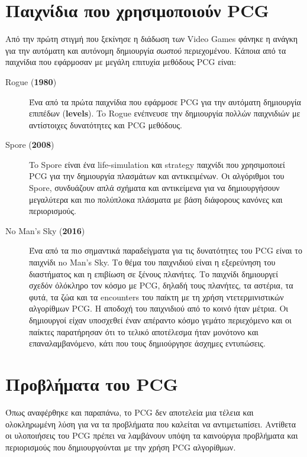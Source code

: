 \section{Παιχνίδια που χρησιμοποιούν PCG}

Από την πρώτη στιγμή που ξεκίνησε η διάδωση των Video Games φάνηκε η ανάγκη για την αυτόματη και αυτόνομη δημιουργία   \textit{σωστού} περιεχομένου. Κάποια από τα παιχνίδια που εφάρμοσαν με μεγάλη επιτυχία μεθόδους PCG είναι:

\begin{description}
\item [Rogue (\textbf{1980})] Ένα από τα πρώτα παιχνίδια που εφάρμοσε PCG για την αυτόματη δημιουργία επιπέδων (\textbf{levels}). To Rogue ενέπνευσε την δημιουργία πολλών παιχνιδιών με αντίστοιχες δυνατότητες και PCG μεθόδους.

\item [Spore (\textbf{2008})] To Spore είναι ένα life-simulation και strategy παιχνίδι που χρησιμοποιεί PCG για την δημιουργία πλασμάτων και αντικειμένων. Οι αλγόριθμοι του Spore, συνδυάζουν απλά σχήματα και αντικείμενα για να δημιουργήσουν μεγαλύτερα και πιο πολύπλοκα πλάσματα με βάση διάφορους κανόνες και περιορισμούς. 

\item [No Man's Sky (\textbf{2016})] Ένα από τα πιο σημαντικά παραδείγματα για τις δυνατότητες του PCG είναι το παιχνίδι no Man's Sky. Το θέμα του παιχνιδιού είναι η εξερεύνηση του διαστήματος και η επιβίωση σε ξένους πλανήτες. Το παιχνίδι δημιουργεί σχεδόν όλόκληρο τον κόσμο με PCG, δηλαδή τους πλανήτες, τα αστέρια, τα φυτά, τα ζώα και τα encounters του παίκτη με τη χρήση ντετερμινιστικών αλγορίθμων PCG. Η αποδοχή του παιχνιδιού από το κοινό ήταν μέτρια. Οι δημιουργοί είχαν υποσχεθεί έναν απέραντο κόσμο γεμάτο περιεχόμενο και οι παίκτες παρατήρησαν ότι το τελικό αποτέλεσμα ήταν μονότονο και επαναλαμβανόμενο, κάτι που τους δημιούργησε άσχημες εντυπώσεις. 
\end{description}

\section{Προβλήματα του PCG}
Όπως αναφέρθηκε και παραπάνω, το PCG δεν αποτελεία μια τέλεια και ολοκληρωμένη λύση για να τα προβλήματα που καλείται να αντιμετωπίσει. Αντίθετα οι υλοποιήσεις του PCG πρέπει να λαμβάνουν υπόψη τα καινούργια προβλήματα και περιορισμούς που δημιουργούνται με την χρήση PCG αλγορίθμων. 

